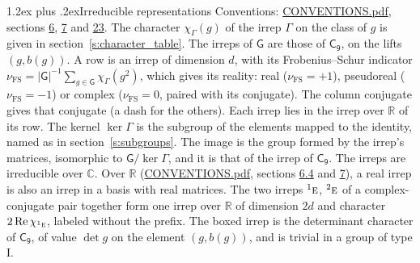 \documentclass[10pt,a4paper]{article}
\makeatletter
\renewcommand\section{\@startsection{section}{1}{\z@}{-3ex plus -1ex minus -.2ex}%
  {1.2ex plus .2ex}{\normalfont\large\sffamily\bfseries\color{parttitle}}}
\numberwithin{equation}{section}
\newcommand{\grp}[1]{\mathsf{#1}}
\newcommand{\irr}[1]{\text{\normalfont\scshape #1}}
\newcommand{\conjpair}[1]{{}^{#1}}
\newcommand{\irchar}[1]{\chi_{#1}}
\newcommand{\fsind}{\nu_{\mathrm{FS}}}
\makeatother
\begin{document}
\section{Irreducible representations}\label{s:irreps}
Conventions: \href{../../CONVENTIONS.pdf}{CONVENTIONS.pdf}, sections \href{../../../rotation/CONVENTIONS.pdf\#conv.6}{6}, \href{../../../rotation/CONVENTIONS.pdf\#conv.7}{7} and \href{../../CONVENTIONS.pdf\#conv.23}{23}.
\leavevmode\label{n:function.character}\label{n:irrep.Gamma}The character $\irchar{\Gamma}(g)$ of the irrep $\Gamma$ on the class of $g$ is given in section~\ref{s:character_table}. The irreps of $\grp{G}$ are those of \href{../../../rotation/data/pdf/C9.pdf}{$\grp{C_{9}}$}, on the lifts $(g, b(g))$.
\leavevmode\label{n:index.dimension}\label{n:index.frobenius}\label{n:head.irrep}\label{n:head.reality}A row is an irrep of dimension $d$, with its Frobenius--Schur indicator $\fsind = |\grp{G}|^{-1}\allowbreak\sum_{g\in\grp{G}}\irchar{\Gamma}(g^2)$, which gives its reality: real ($\fsind = +1$), pseudoreal ($\fsind = -1$) or complex ($\fsind = 0$, paired with its conjugate). \label{n:head.conjugate}The column conjugate gives that conjugate (a dash for the others). \label{n:head.over.real}Each irrep lies in the irrep over $\mathbb{R}$ of its row. \label{n:head.kernel}The kernel $\ker\Gamma$ is the subgroup of the elements mapped to the identity, named as in section~\ref{s:subgroups}. \label{n:head.image}The image is the group formed by the irrep's matrices, isomorphic to $\grp{G}/\ker\Gamma$, and it is that of the irrep of \href{../../../rotation/data/pdf/C9.pdf}{$\grp{C_{9}}$}. The irreps are irreducible over $\mathbb{C}$. Over $\mathbb{R}$ (\href{../../CONVENTIONS.pdf}{CONVENTIONS.pdf}, sections \href{../../../rotation/CONVENTIONS.pdf\#conv.6.4}{6.4} and \href{../../../rotation/CONVENTIONS.pdf\#conv.7}{7}), a real irrep is also an irrep in a basis with real matrices. The two irreps $\conjpair{1}\irr{e}$, $\conjpair{2}\irr{e}$ of a complex-conjugate pair together form one irrep over $\mathbb{R}$ of dimension $2d$ and character $2\operatorname{Re}\irchar{\conjpair{1}\irr{e}}$, labeled without the prefix. \label{n:mark.determinant}The boxed irrep is the determinant character of \href{../../../rotation/data/pdf/C9.pdf}{$\grp{C_{9}}$}, of value $\det g$ on the element $(g, b(g))$, and is trivial in a group of type I.
\setlength{\emergencystretch}{2em}\par\setlength{\emergencystretch}{0pt}
\end{document}
